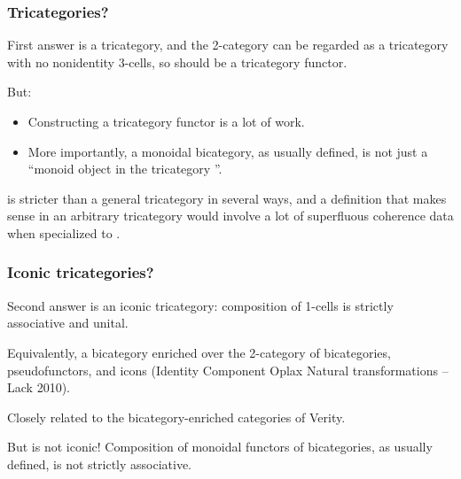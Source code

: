 \documentclass{beamer}
\begin{document}
\begin{frame}
  \frametitle{Tricategories?}
  \begin{block}{First answer}
    \cBicat is a tricategory, and the 2-category \cDbl can be regarded as a tricategory with no nonidentity 3-cells, so \cL should be a tricategory functor.
  \end{block}
  But:
  \begin{itemize}
  \item Constructing a tricategory functor is a lot of work.
  \item More importantly, a monoidal bicategory, as usually defined, is \alert{not} just a ``monoid object in the tricategory \cBicat''.
  \end{itemize}
  \cBicat is stricter than a general tricategory in several ways, and a definition that makes sense in an arbitrary tricategory would involve a lot of superfluous coherence data when specialized to \cBicat.
\end{frame}

\begin{frame}
  \frametitle{Iconic tricategories?}
  \begin{block}{Second answer}
    \cBicat is an \alert{iconic tricategory}: composition of 1-cells is strictly associative and unital.
  \end{block}
  Equivalently, a bicategory enriched over the 2-category of bicategories, pseudofunctors, and \alert{icons} (\alert{I}dentity \alert{C}omponent \alert{O}plax \alert{N}atural transformations -- Lack 2010).

	\bigskip
  Closely related to the \alert{bicategory-enriched categories} of Verity.

    \bigskip
  But \cMonBicat is \alert{not} iconic!
  Composition of monoidal functors of bicategories, as usually defined, is not strictly associative.
\end{frame}
\end{document}
